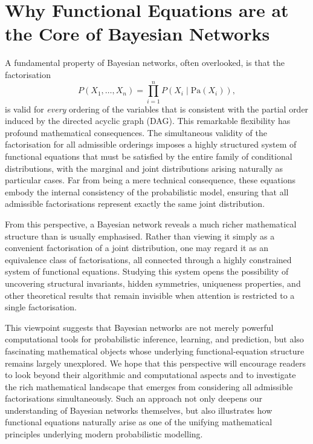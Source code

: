 \begin{center}
\end{center}


\section{Why Functional Equations are at the Core of Bayesian Networks}

A fundamental property of Bayesian networks, often overlooked, is that the factorisation
\[
P(X_1,\dots,X_n)=\prod_{i=1}^{n}P(X_i\mid\mathrm{Pa}(X_i)),
\]
is valid for \emph{every} ordering of the variables that is consistent with the partial order induced by the directed acyclic graph (DAG). This remarkable flexibility has profound mathematical consequences. The simultaneous validity of the factorisation for all admissible orderings imposes a highly structured system of functional equations that must be satisfied by the entire family of conditional distributions, with the marginal and joint distributions arising naturally as particular cases. Far from being a mere technical consequence, these equations embody the internal consistency of the probabilistic model, ensuring that all admissible factorisations represent exactly the same joint distribution.

From this perspective, a Bayesian network reveals a much richer mathematical structure than is usually emphasised. Rather than viewing it simply as a convenient factorisation of a joint distribution, one may regard it as an equivalence class of factorisations, all connected through a highly constrained system of functional equations. Studying this system opens the possibility of uncovering structural invariants, hidden symmetries, uniqueness properties, and other theoretical results that remain invisible when attention is restricted to a single factorisation.

This viewpoint suggests that Bayesian networks are not merely powerful computational tools for probabilistic inference, learning, and prediction, but also fascinating mathematical objects whose underlying functional-equation structure remains largely unexplored. We hope that this perspective will encourage readers to look beyond their algorithmic and computational aspects and to investigate the rich mathematical landscape that emerges from considering all admissible factorisations simultaneously. Such an approach not only deepens our understanding of Bayesian networks themselves, but also illustrates how functional equations naturally arise as one of the unifying mathematical principles underlying modern probabilistic modelling.

